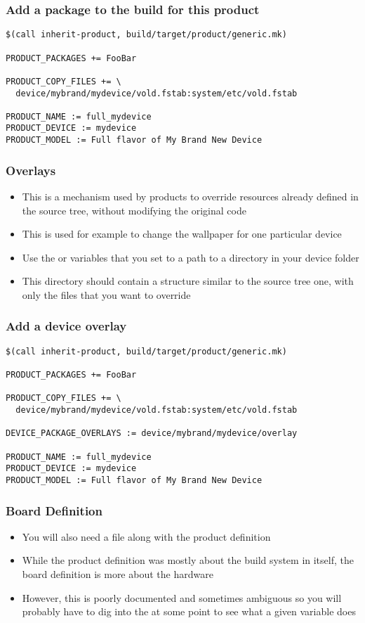 \begin{frame}[fragile]
  \frametitle{Add a package to the build for this product}
\begin{verbatim}
$(call inherit-product, build/target/product/generic.mk)

PRODUCT_PACKAGES += FooBar

PRODUCT_COPY_FILES += \
  device/mybrand/mydevice/vold.fstab:system/etc/vold.fstab

PRODUCT_NAME := full_mydevice
PRODUCT_DEVICE := mydevice
PRODUCT_MODEL := Full flavor of My Brand New Device
\end{verbatim}
\end{frame}

\begin{frame}
  \frametitle{Overlays}
  \begin{itemize}
  \item This is a mechanism used by products to override resources
    already defined in the source tree, without modifying the original
    code
  \item This is used for example to change the wallpaper for one
    particular device
  \item Use the  or
     variables that you set to a path
    to a directory in your device folder
  \item This directory should contain a structure similar to the
    source tree one, with only the files that you want to override
  \end{itemize}
\end{frame}


\begin{frame}[fragile]
  \frametitle{Add a device overlay}
\begin{verbatim}
$(call inherit-product, build/target/product/generic.mk)

PRODUCT_PACKAGES += FooBar

PRODUCT_COPY_FILES += \
  device/mybrand/mydevice/vold.fstab:system/etc/vold.fstab

DEVICE_PACKAGE_OVERLAYS := device/mybrand/mydevice/overlay

PRODUCT_NAME := full_mydevice
PRODUCT_DEVICE := mydevice
PRODUCT_MODEL := Full flavor of My Brand New Device
\end{verbatim}
\end{frame}

\begin{frame}
  \frametitle{Board Definition}
  \begin{itemize}
  \item You will also need a  file along with the
    product definition
  \item While the product definition was mostly about the build system
    in itself, the board definition is more about the hardware
  \item However, this is poorly documented and sometimes ambiguous so
    you will probably have to dig into the 
    at some point to see what a given variable does
  \end{itemize}
\end{frame}

